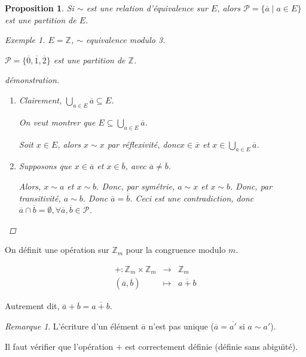 \documentclass{report}
\newcommand*{\entiers}{\mathbb{Z}}
\newtheorem*{prop}{Proposition}
\theoremstyle{definition}
\theoremstyle{remark}
\newtheorem*{exem}{Exemple}
\newtheorem*{rema}{Remarque}
\begin{document}
	\begin{prop}
		Si $\sim$ est une relation d'\'equivalence sur $E$, alors $\mathcal{P} = \{\overline{a} \mid a \in E\}$ est une partition de $E$.
		\begin{exem}
			$E = \entiers$, $\sim$ equivalence modulo 3.

			$\mathcal{P} = \{\overline{0}, \overline{1}, \overline{2}\}$ est une partition de $\entiers$.
		\end{exem}
		\begin{proof}[d\'emonstration]~

			\begin{enumerate}[label=(\arabic*)]
				\item Clairement, $\bigcup\limits_{a \in E}\overline{a} \subseteq E$.

				On veut montrer que $E \subseteq \bigcup\limits_{a \in E}\overline{a}$.

				Soit $x \in E$, alors $x \sim x$ par r\'eflexivit\'e, donc$x \in \overline{x}$ et $x \in \bigcup\limits_{a \in E}\overline{a}$.
				\item Supposons que $x \in \overline{a}$ et $x \in \overline{b}$, avec $\overline{a} \neq \overline{b}$.

				Alors, $x \sim a$ et $x \sim b$. Donc, par sym\'etrie, $a \sim x$ et $x \sim b$. Donc, par transitivit\'e, $a \sim b$. Donc $\overline{a} = \overline{b}$. Ceci est une contradiction, donc $\overline{a} \cap \overline{b} = \emptyset, \forall \overline{a}, \overline{b} \in \mathcal{P}$.
			\end{enumerate}
		\end{proof}
	\end{prop}

	On d\'efinit une op\'eration sur $\entiers_m$ pour la congruence modulo $m$.

	\[
	\begin{array}{rcl}
		+:\entiers_m \times \entiers_m& \to& \entiers_m\\
		(\overline{a}, \overline{b})& \mapsto& \overline{a+b}
	\end{array}
	\]

	Autrement dit, $\overline{a} + \overline{b} = \overline{a+b}$.
	\begin{rema}
		L'\'ecriture d'un \'el\'ement $\overline{a}$ n'est pas unique ($\overline{a} = \overline{a'}$ si $a \sim a'$).
	\end{rema}

	Il faut v\'erifier que l'op\'eration $+$ est correctement d\'efinie (d\'efinie sans abigu\"\i t\'e).
\end{document}
